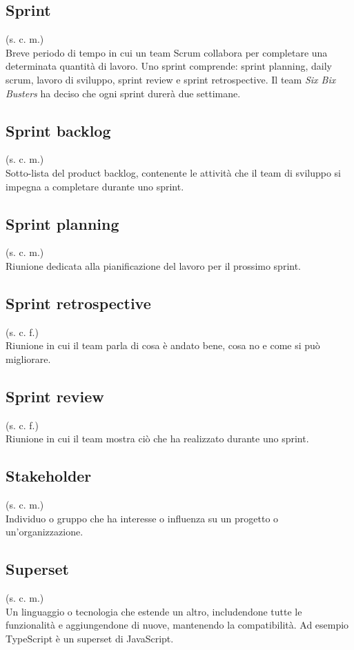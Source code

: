 \subsection{Sprint}
\label{Sprint}
(s. c. m.)\\
Breve periodo di tempo in cui un team Scrum collabora per completare
una determinata quantità di lavoro. Uno sprint comprende:
sprint planning, daily scrum, lavoro di sviluppo,
sprint review e sprint retrospective. Il team \textit{Six Bix Busters} ha
deciso che ogni sprint durerà due settimane.
\subsection{Sprint backlog}
\label{Sprint backlog}
(s. c. m.)\\
Sotto-lista del product backlog, contenente le attività che il team di sviluppo
si impegna a completare durante uno sprint.
\subsection{Sprint planning}
(s. c. m.)\\
Riunione dedicata alla pianificazione del lavoro per il prossimo sprint.
\subsection{Sprint retrospective}
\label{Sprint retrospective}
(s. c. f.)\\
Riunione in cui il team parla di cosa è andato bene, cosa no e come si può migliorare.
\subsection{Sprint review}
(s. c. f.)\\
Riunione in cui il team mostra ciò che ha realizzato durante uno sprint.
\subsection{Stakeholder}
(s. c. m.)\\
Individuo o gruppo che ha interesse o influenza su un progetto o un'organizzazione.
\subsection{Superset}
(s. c. m.)\\
Un linguaggio o tecnologia che estende un altro, includendone tutte le funzionalità e
aggiungendone di nuove, mantenendo la compatibilità. Ad esempio TypeScript è un superset di JavaScript.
\pagebreak
